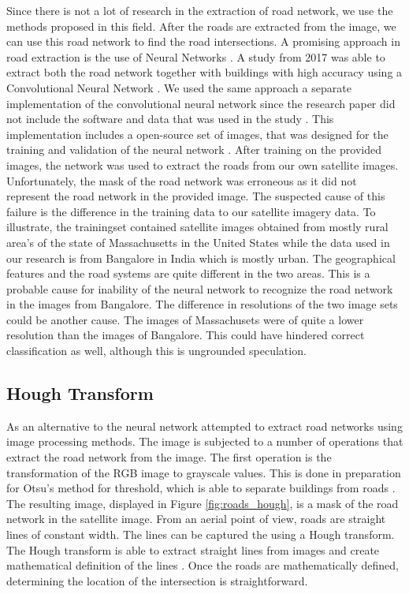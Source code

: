 Since there is not a lot of research in the extraction of road network, we use the methods proposed in this field. After the roads are extracted from the image, we can use this road network to find the road intersections. A promising approach in road extraction is the use of Neural Networks \cite{mangala2011extraction} \cite{mokhtarzade2007road}. A study from 2017 was able to extract both the road network together with buildings with high accuracy using a Convolutional Neural Network \cite{alshehhi2017simultaneous}. We used the same approach a separate implementation of the convolutional neural network since the research paper did not include the software and data that was used in the study \cite{airs}. This implementation includes a open-source set of images, that was designed for the training and validation of the neural network \cite{MnihThesis}. After training on the provided images, the network was used to extract the roads from our own satellite images.  Unfortunately, the mask of the road network was erroneous as it did not represent the road network in the provided image. The suspected cause of this failure is the difference in the training data to our satellite imagery data. To illustrate, the trainingset contained satellite images obtained from mostly rural area's of the state of Massachusetts in the United States while the data used in our research is from Bangalore in India which is mostly urban. The geographical features and the road systems are quite different in the two areas. This is a probable cause for inability of the neural network to recognize the road network in the images from Bangalore. The difference in resolutions
of the two image sets could be another cause. The images of Massachusets were of quite a lower resolution than the images of Bangalore. This could have hindered correct classification as well, although this is ungrounded speculation.

\subsection{Hough Transform}
As an alternative to the neural network attempted to extract road networks using image processing methods. The image is subjected to a number of operations that extract the road network from the image. The first operation is the transformation of the RGB image to grayscale values. This is done in preparation for Otsu's method for threshold, which is able to separate buildings from roads \cite{otsu1979threshold}. The resulting image, displayed in Figure \ref{fig:roads_hough}, is a mask of the road network in the satellite image. From an aerial point of view, roads are straight lines of
constant width. The lines can be captured the using a Hough transform. The Hough transform is able to extract straight lines from images and create mathematical definition of the lines \cite{duda1972use}.  Once the roads are mathematically defined, determining the location of the intersection is straightforward.

